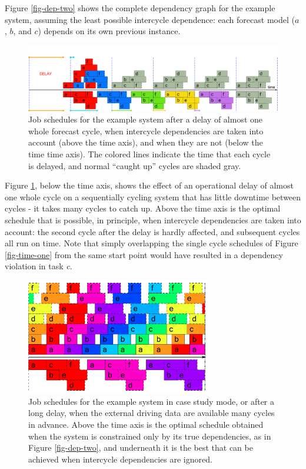 \documentclass[11pt,a4paper]{article}
\begin{document}
Figure \ref{fig-dep-two} shows the complete dependency graph for the
example system, assuming the least possible intercycle dependence: each
forecast model ($a$, $b$, and $c$) depends on its own previous instance.

\begin{figure} 
    \begin{center} 
        \includegraphics[width=12cm]{timeline-three}
    \end{center} 
    \caption{\small Job schedules for the example system after a delay
    of almost one whole forecast cycle, when intercycle dependencies are
    taken into account (above the time axis), and when they are not
    (below the time time axis). The colored lines indicate the time that
    each cycle is delayed, and normal ``caught up'' cycles
    are shaded gray.} 
    \label{fig-time-three}
\end{figure} 

Figure \ref{fig-time-three}, below the time axis, shows the effect of an
operational delay of almost one whole cycle on a sequentially cycling
system that has little downtime between cycles - it takes many cycles to
catch up. Above the time axis is the optimal schedule that is possible,
in principle, when intercycle dependencies are taken into account: the
second cycle after the delay is hardly affected, and subsequent cycles
all run on time.  Note that simply overlapping the single cycle
schedules of Figure \ref{fig-time-one} from the same start point would
have resulted in a dependency violation in task {\em c}.

\begin{figure} 
    \begin{center} 
        \includegraphics[width=8cm]{timeline-two}
    \end{center} 
    \caption{\small Job schedules for the example system in case study
    mode, or after a long delay, when the external driving data are
    available many cycles in advance. Above the time axis is the optimal
    schedule obtained when the system is constrained only by its true
    dependencies, as in Figure \ref{fig-dep-two}, and underneath it is
    the best that can be achieved when intercycle dependencies are
    ignored.} 
    \label{fig-time-two}
\end{figure} 
\end{document}

